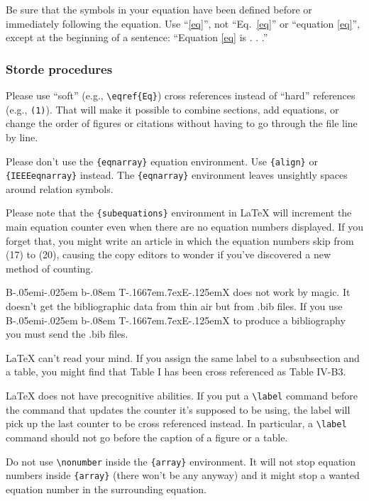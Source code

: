 \documentclass[conference]{IEEEtran}
\def\BibTeX{{\rm B\kern-.05em{\sc i\kern-.025em b}\kern-.08em
    T\kern-.1667em\lower.7ex\hbox{E}\kern-.125emX}}
\begin{document}
Be sure that the 
symbols in your equation have been defined before or immediately following 
the equation. Use ``\eqref{eq}'', not ``Eq.~\eqref{eq}'' or ``equation \eqref{eq}'', except at 
the beginning of a sentence: ``Equation \eqref{eq} is . . .''

\subsubsection{Storde procedures}

Please use ``soft'' (e.g., \verb|\eqref{Eq}|) cross references instead
of ``hard'' references (e.g., \verb|(1)|). That will make it possible
to combine sections, add equations, or change the order of figures or
citations without having to go through the file line by line.

Please don't use the \verb|{eqnarray}| equation environment. Use
\verb|{align}| or \verb|{IEEEeqnarray}| instead. The \verb|{eqnarray}|
environment leaves unsightly spaces around relation symbols.

Please note that the \verb|{subequations}| environment in {\LaTeX}
will increment the main equation counter even when there are no
equation numbers displayed. If you forget that, you might write an
article in which the equation numbers skip from (17) to (20), causing
the copy editors to wonder if you've discovered a new method of
counting.

{\BibTeX} does not work by magic. It doesn't get the bibliographic
data from thin air but from .bib files. If you use {\BibTeX} to produce a
bibliography you must send the .bib files. 

{\LaTeX} can't read your mind. If you assign the same label to a
subsubsection and a table, you might find that Table I has been cross
referenced as Table IV-B3. 

{\LaTeX} does not have precognitive abilities. If you put a
\verb|\label| command before the command that updates the counter it's
supposed to be using, the label will pick up the last counter to be
cross referenced instead. In particular, a \verb|\label| command
should not go before the caption of a figure or a table.

Do not use \verb|\nonumber| inside the \verb|{array}| environment. It
will not stop equation numbers inside \verb|{array}| (there won't be
any anyway) and it might stop a wanted equation number in the
surrounding equation.
\end{document}
